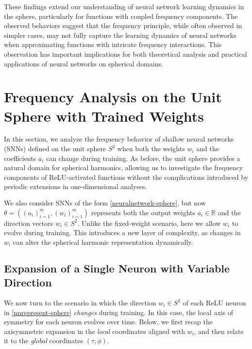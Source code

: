 \documentclass[review,onefignum,onetabnum,onealgnum]{siamart250106}
\numberwithin{theorem}{section}
\begin{document}
These findings extend our understanding of neural network learning dynamics in the sphere, particularly for functions with coupled frequency components. The observed behaviors suggest that the frequency principle, while often observed in simpler cases, may not fully capture the learning dynamics of neural networks when approximating functions with intricate frequency interactions. This observation has important implications for both theoretical analysis and practical applications of neural networks on spherical domains.



\section{Frequency Analysis on the Unit Sphere with Trained Weights}
\label{Sec:SphericalAnalysisTW}

In this section, we analyze the frequency behavior of shallow neural networks (SNNs) defined on the unit sphere \( S^2 \) when both the weights \( w_i \) and the coefficients \( a_i \) can change during training. As before, the unit sphere provides a natural domain for spherical harmonics, allowing us to investigate the frequency components of ReLU-activated functions without the complications introduced by periodic extensions in one-dimensional analyses.

We also consider SNNs of the form \eqref{neuralnetwork-sphere}, but now \(\theta = ((a_i)_{i=1}^m, (w_i)_{i=1}^m)\) represents both the output weights \( a_i \in \mathbb{R} \) and the direction vectors \( w_i \in S^2 \). Unlike the fixed-weight scenario, here we allow \( w_i \) to evolve during training. This introduces a new layer of complexity, as changes in \( w_i \) can alter the spherical harmonic representation dynamically.

\subsection{Expansion of a Single Neuron with Variable Direction}
\label{subsec:NeuronExpansionVariableDir}

We now turn to the scenario in which the direction \(w_i \in S^2\) of each ReLU neuron 
in \eqref{nnrepresent-sphere} \emph{changes} during training.  In this case, the local axis of symmetry 
for each neuron evolves over time.  Below, we first recap the axisymmetric expansion in the \emph{local} 
coordinates aligned with \(w_i\), and then relate it to the \emph{global} coordinates \((\tau,\phi)\).
\end{document}
